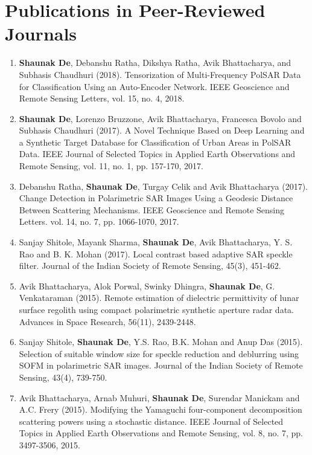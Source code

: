 \documentclass[12pt, a4paper]{article}
\begin{document}
\section*{Publications in Peer-Reviewed Journals}
{\small
\begin{enumerate} 

\item {}\quad \textbf{Shaunak De}, Debanshu Ratha, Dikshya Ratha, Avik Bhattacharya, and Subhasis Chaudhuri (2018). Tensorization of Multi-Frequency PolSAR Data for Classification Using an Auto-Encoder Network. IEEE Geoscience and Remote Sensing Letters, vol. 15, no. 4, 2018.

\item {}\quad \textbf{Shaunak De}, Lorenzo Bruzzone, Avik Bhattacharya, Francesca Bovolo and Subhasis Chaudhuri (2017). A Novel Technique Based on Deep Learning and a Synthetic Target Database for Classification of Urban Areas in PolSAR Data. IEEE Journal of Selected Topics in Applied Earth Observations and Remote Sensing, vol. 11, no. 1, pp. 157-170, 2017. 

\item {}\quad Debanshu Ratha, \textbf{Shaunak De}, Turgay Celik and Avik Bhattacharya (2017). Change Detection in Polarimetric SAR Images Using a Geodesic Distance Between Scattering Mechanisms. IEEE Geoscience and Remote Sensing Letters. vol. 14, no. 7, pp. 1066-1070, 2017. 

\item Sanjay Shitole, Mayank Sharma, \textbf{Shaunak De}, Avik Bhattacharya, Y. S. Rao and B. K. Mohan (2017). Local contrast based adaptive SAR speckle filter. Journal of the Indian Society of Remote Sensing, 45(3), 451-462.

\item Avik Bhattacharya, Alok Porwal, Swinky Dhingra, \textbf{Shaunak De}, G. Venkataraman (2015). Remote estimation of dielectric permittivity of lunar surface regolith using compact polarimetric synthetic aperture radar data. Advances in Space Research, 56(11), 2439-2448.

\item Sanjay Shitole, \textbf{Shaunak De}, Y.S. Rao, B.K. Mohan and Anup Das (2015). Selection of suitable window size for speckle reduction and deblurring using SOFM in polarimetric SAR images. Journal of the Indian Society of Remote Sensing, 43(4), 739-750.

\item Avik Bhattacharya, Arnab Muhuri, \textbf{Shaunak De}, Surendar Manickam and A.C. Frery (2015). Modifying the Yamaguchi four-component decomposition scattering powers using a stochastic distance. IEEE Journal of Selected Topics in Applied Earth Observations and Remote Sensing, vol. 8, no. 7, pp. 3497-3506, 2015.


\end{enumerate}}
\end{document}
